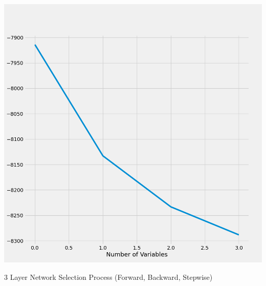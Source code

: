 \documentclass{article}
\begin{document}
	\includegraphics[scale = 0.2]{../plots/python/AICConcreteStepwisePCP.png}
	
	3 Layer Network Selection Process (Forward, Backward, Stepwise)
	
\end{document}
